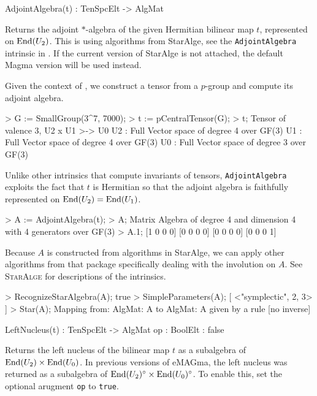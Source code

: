 \begin{intrinsics}
AdjointAlgebra(t) : TenSpcElt -> AlgMat
\end{intrinsics}

Returns the adjoint $*$-algebra of the given Hermitian bilinear map $t$, represented on $\operatorname{End}(U_2)$. 
This is using algorithms from {\sc StarAlge}, see the \texttt{AdjointAlgebra} intrinsic in \cite{BW:StarAlge}.
If the current version of {\sc StarAlge} is not attached, the default {\sc Magma} version will be used instead.

\begin{example}[AdjointAlge]

Given the context of \cite{BW:isometry}, we construct a tensor from a $p$-group and compute its adjoint algebra.
\begin{code}
> G := SmallGroup(3^7, 7000);
> t := pCentralTensor(G);
> t;
Tensor of valence 3, U2 x U1 >-> U0
U2 : Full Vector space of degree 4 over GF(3)
U1 : Full Vector space of degree 4 over GF(3)
U0 : Full Vector space of degree 3 over GF(3)
\end{code}

Unlike other intrinsics that compute invariants of tensors, \texttt{AdjointAlgebra} exploits the fact that $t$ is Hermitian so that the adjoint algebra is faithfully represented on $\operatorname{End}(U_2)=\operatorname{End}(U_1)$. 
\begin{code}
> A := AdjointAlgebra(t);
> A;
Matrix Algebra of degree 4 and dimension 4 with 4 generators over GF(3)
> A.1;
[1 0 0 0]
[0 0 0 0]
[0 0 0 0]
[0 0 0 1]
\end{code}

Because $A$ is constructed from algorithms in {\sc StarAlge}, we can apply other algorithms from that package specifically dealing with the involution on $A$.
See \textsc{StarAlge} \cite{BW:StarAlge} for descriptions of the intrinsics.
\begin{code}
> RecognizeStarAlgebra(A);
true
> SimpleParameters(A);
[ <"symplectic", 2, 3> ]
> Star(A);
Mapping from: AlgMat: A to AlgMat: A given by a rule [no inverse]
\end{code}
\end{example}

\begin{intrinsics}
LeftNucleus(t) : TenSpcElt -> AlgMat
    op : BoolElt : false
\end{intrinsics}

Returns the left nucleus of the bilinear map $t$ as a subalgebra of $\operatorname{End}(U_2)\times \operatorname{End}(U_0)$.
In previous versions of eMAGma, the left nucleus was returned as a subalgebra of $\operatorname{End}(U_2)^\circ\times \operatorname{End}(U_0)^\circ$.
To enable this, set the optional arugment \texttt{op} to \texttt{true}.

